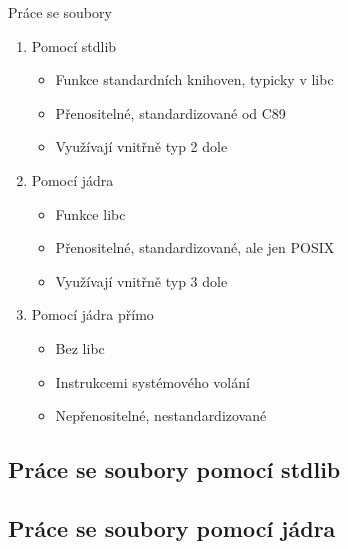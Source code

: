 \begin{frame}{Práce se soubory}

  \begin{enumerate}
    \item Pomocí stdlib
    \begin{itemize}
      \item Funkce standardních knihoven, typicky v libc
      \item Přenositelné, standardizované od C89
      \item Využívají vnitřně typ 2 dole
    \end{itemize}

    \pause

    \item Pomocí jádra
    \begin{itemize}
      \item Funkce libc
      \item Přenositelné, standardizované, ale jen POSIX
      \item Využívají vnitřně typ 3 dole
    \end{itemize}

    \pause

    \item Pomocí jádra přímo
    \begin{itemize}
      \item Bez libc
      \item Instrukcemi systémového volání
      \item Nepřenositelné, nestandardizované
    \end{itemize}
  \end{enumerate}

\end{frame}

\subsection*{Práce se soubory pomocí stdlib}
\frame{\subsectionpage}



\subsection*{Práce se soubory pomocí jádra}
\frame{\subsectionpage}

